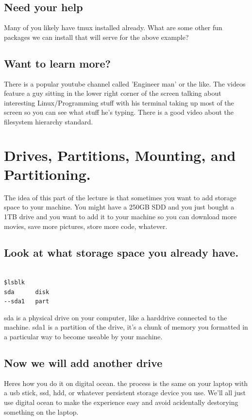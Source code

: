 \documentclass[10pt]{article}
\begin{document}
\subsection{Need your help}
Many of you likely have tmux installed already. What
are some other fun packages we can install that will serve for the above
example?

\subsection{Want to learn more?}

There is a popular youtube channel called
'Engineer man' or the like. The videos feature a guy sitting in the lower right
corner of the screen talking about interesting Linux/Programming stuff with his
terminal taking up most of the screen so you can see what stuff he's typing.
There is a good video about the filesystem hierarchy standard.


\section{Drives, Partitions, Mounting, and Partitioning.}

 The idea of this part
of the lecture is that sometimes you want to add storage space to your machine.
You might have a 250GB SDD and you just bought a 1TB drive and you want to add
it to your machine so you can download more movies, save more pictures, store
more code, whatever.

\subsection{Look at what storage space you already have.}

\begin{lstlisting}

$lsblk
sda      disk
--sda1   part 
\end{lstlisting}

sda is a physical drive on your computer, like a harddrive connected to the
machine. sda1 is a partition of the drive, it's a chunk of memory you formatted
in a particular way to become useable by your machine.

\subsection{ Now we will add another drive}
Heres how you do it on digital ocean. the process is the same on your laptop
with a usb stick, ssd, hdd, or whatever persistent storage device you use. We'll
all just use digital ocean to make the experience easy and avoid acidentally
destorying something on the laptop.
\end{document}
